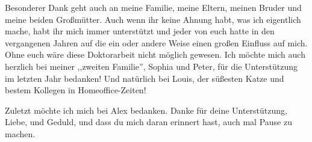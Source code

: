 Besonderer Dank geht auch an meine Familie, meine Eltern, meinen Bruder und meine beiden Großmütter. Auch wenn ihr keine Ahnung habt, was ich eigentlich mache, habt ihr mich immer unterstützt und jeder von euch hatte in den vergangenen Jahren auf die ein oder andere Weise einen großen Einfluss auf mich. Ohne euch wäre diese Doktorarbeit nicht möglich gewesen. Ich möchte mich auch herzlich bei meiner ,,zweiten Familie'', Sophia und Peter, für die Unterstützung im letzten Jahr bedanken! Und natürlich bei Louis, der süßesten Katze und bestem Kollegen in Homeoffice-Zeiten!

Zuletzt möchte ich mich bei Alex bedanken. Danke für deine Unterstützung, Liebe, und Geduld, und dass du mich daran erinnert hast, auch mal Pause zu machen.